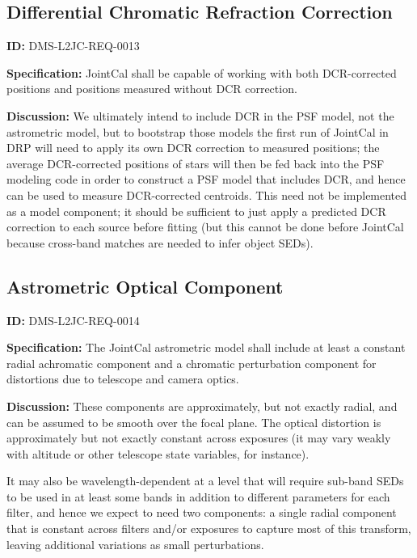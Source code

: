 \documentclass[SE,toc,lsstdraft]{lsstdoc}
\begin{document}
\subsection{Differential Chromatic Refraction Correction}

\label{DMS-L2JC-REQ-0013}
\textbf{ID:} DMS-L2JC-REQ-0013

\textbf{Specification:}
JointCal shall be capable of working with both DCR-corrected positions and positions measured without DCR correction.

\textbf{Discussion:}
We ultimately intend to include DCR in the PSF model, not the astrometric model, but to bootstrap those models the first run of JointCal in DRP will need to apply its own DCR correction to measured positions; the average DCR-corrected positions of stars will then be fed back into the PSF modeling code in order to construct a PSF model that includes DCR, and hence can be used to measure DCR-corrected centroids.  This need not be implemented as a model component; it should be sufficient to just apply a predicted DCR correction to each source before fitting (but this cannot be done before JointCal because cross-band matches are needed to infer object SEDs).

\subsection{Astrometric Optical Component}

\label{DMS-L2JC-REQ-0014}
\textbf{ID:} DMS-L2JC-REQ-0014

\textbf{Specification:}
The JointCal astrometric model shall include at least a constant radial achromatic component and a chromatic perturbation component for distortions due to telescope and camera optics.

\textbf{Discussion:}
These components are approximately, but not exactly radial, and can be assumed to be smooth over the focal plane.  The optical distortion is approximately but not exactly constant across exposures (it may vary weakly with altitude or other telescope state variables, for instance).

It may also be wavelength-dependent at a level that will require sub-band SEDs to be used in at least some bands in addition to different parameters for each filter, and hence we expect to need two components: a single radial component that is constant across filters and/or exposures to capture most of this transform, leaving additional variations as small perturbations.
\end{document}
